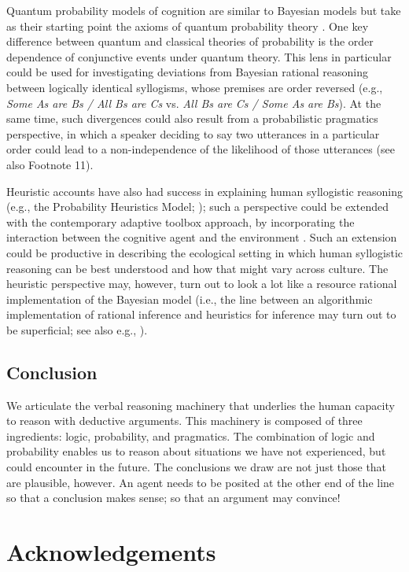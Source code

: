 \documentclass[floatsintext, man]{apa6}
\begin{document}
Quantum probability models of cognition are similar to Bayesian models but take as their starting point the axioms of quantum probability theory \cite{pothos2013can}. One key difference between quantum and classical theories of probability is the order dependence of conjunctive events under quantum theory. This lens in particular could be used for investigating deviations from Bayesian rational reasoning between logically identical syllogisms, whose premises are order reversed (e.g., \emph{Some As are Bs / All Bs are Cs} vs. \emph{All Bs are Cs / Some As are Bs}).
At the same time, such divergences could also result from a probabilistic pragmatics perspective, in which a speaker deciding to say two utterances in a particular order could lead to a non-independence of the likelihood of those utterances (see also Footnote 11). 

Heuristic accounts have also had success in explaining human syllogistic reasoning (e.g., the Probability Heuristics Model; ); such a perspective could be extended with the contemporary adaptive toolbox approach, by incorporating the interaction between the cognitive agent and the environment \cite{hertwig2019taming}. 
Such an extension could be productive in describing the ecological setting in which human syllogistic reasoning can be best understood and how that might vary across culture. 
The heuristic perspective may, however, turn out to look a lot like a resource rational implementation of the Bayesian model (i.e., the line between an algorithmic implementation of rational inference and heuristics for inference may turn out to be superficial; see also e.g., ). 


\subsection{Conclusion}


We articulate the verbal reasoning machinery that underlies the human capacity to reason with deductive arguments. 
This machinery is composed of three ingredients: logic, probability, and pragmatics. 
The combination of logic and probability enables us to reason about situations we have not experienced, but could encounter in the future.
The conclusions we draw are not just those that are plausible, however.
An agent needs to be posited at the other end of the line so that a conclusion makes sense; so that an argument may convince!


 \section{Acknowledgements}
 
\end{document}
